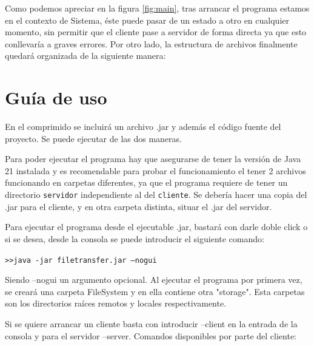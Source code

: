 \documentclass[a4paper, 12pt]{report}
\begin{document}
Como podemos apreciar en la figura \ref{fig:main}, tras arrancar el programa estamos en el contexto de Sistema, éste puede pasar de un estado a otro en cualquier momento, sin permitir que el cliente pase a servidor de forma directa ya que esto conllevaría a graves errores.
Por otro lado, la estructura de archivos finalmente quedará organizada de la siguiente manera:

\newpage
\begin{figure}
\end{figure}

\chapter{Guía de uso}
En el comprimido se incluirá un archivo .jar y además el código fuente del proyecto. Se puede ejecutar de las dos maneras.

Para poder ejecutar el programa hay que asegurarse de tener la versión de Java 21 instalada y es recomendable para probar el funcionamiento el tener 2 archivos funcionando en carpetas diferentes, ya que el programa requiere de tener un directorio \texttt{servidor} independiente al del \texttt{cliente}.
Se debería hacer una copia del
.jar para el cliente, y en otra carpeta distinta, situar el .jar del servidor.

Para ejecutar el programa desde el ejecutable .jar, bastará con darle doble click o si se desea, desde la consola se puede introducir el siguiente comando:

\texttt{\textgreater\textgreater java -jar filetransfer.jar --nogui}

Siendo --nogui un argumento opcional.
Al ejecutar el programa por primera vez, se creará una carpeta FileSystem y en ella contiene otra "storage".
Esta carpetas son los directorios raíces remotos y locales respectivamente.

Si se quiere arrancar un cliente basta con introducir --client en la entrada de la consola y para el servidor --server.
Comandos disponibles por parte del cliente:
\end{document}
